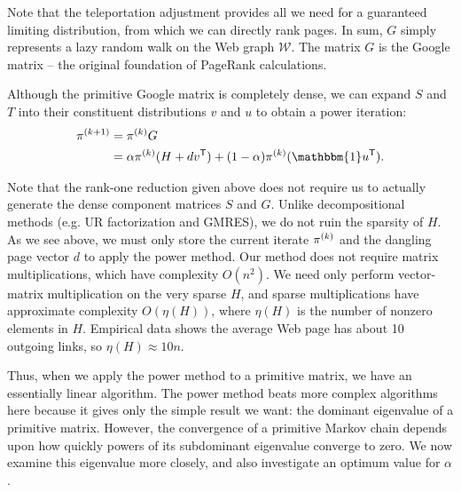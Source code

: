\documentclass[../exploring-pagerank.tex]{subfiles}
\begin{document}
	Note that the teleportation adjustment provides all we need for a guaranteed limiting distribution, from which we can directly rank pages. In sum, $G$ simply represents a lazy random walk on the Web graph $\mathcal{W}$. The matrix $G$ is the Google matrix -- the original foundation of PageRank calculations.

	Although the primitive Google matrix is completely dense, we can expand $S$ and $T$ into their constituent distributions $v$ and $u$ to obtain a power iteration:
    \begin{align*}
        \iterate{\pi}{k+1} &= \iterate{\pi}{k} G \\
        &= \alpha \iterate{\pi}{k} (H + d \transpose{v}) + (1 - \alpha) \iterate{\pi}{k} (\mathbbm{1} \transpose{u}).
    \end{align*}

    Note that the rank-one reduction given above does not require us to actually generate the dense component matrices $S$ and $G$. Unlike decompositional methods (e.g. UR factorization and GMRES), we do not ruin the sparsity of $H$. As we see above, we must only store the current iterate $\pi^{(k)}$ and the dangling page vector $d$ to apply the power method. Our method does not require matrix multiplications, which have complexity $O(n^2)$. We need only perform vector-matrix multiplication on the very sparse $H$, and sparse multiplications have approximate complexity $O(\eta(H))$, where $\eta(H)$ is the number of nonzero elements in $H$. Empirical data shows the average Web page has about 10 outgoing links, so $\eta(H) \approx 10n$.

    Thus, when we apply the power method to a primitive matrix, we have an essentially linear algorithm. The power method beats more complex algorithms here because it gives only the simple result we want: the dominant eigenvalue of a primitive matrix. However, the convergence of a primitive Markov chain depends upon how quickly powers of its subdominant eigenvalue converge to zero. We now examine this eigenvalue more closely, and also investigate an optimum value for $\alpha$.
\end{document}
